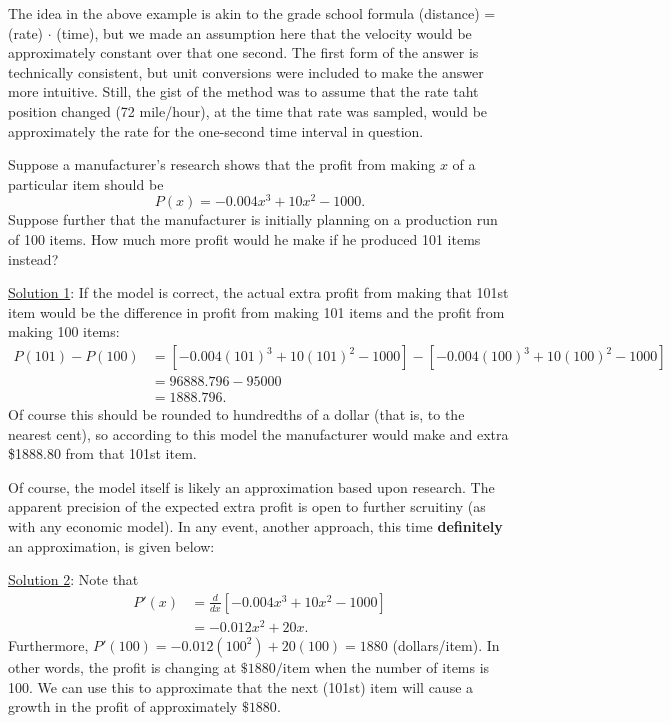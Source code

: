\label{VelocityAndLinearApproximationsI}
\eex
The idea in the above example
is  akin to the grade school formula (distance) = (rate) $\cdot$ (time),
but we made an assumption here that the velocity would be
approximately constant over that one second.  The first form 
of the answer is technically consistent, but unit conversions
were  included to make the answer more intuitive.
Still, the gist of the method was to assume
that the rate taht position changed (72 mile/hour), at the time
that rate was sampled, would be approximately the rate for the
one-second time interval in question.

\bex Suppose a manufacturer's research shows that the profit
from making $x$ of a particular item should be
$$P(x)=-0.004x^3+10x^2-1000.$$
Suppose further that the manufacturer is initially planning on a 
production run of 100 items.  How much more profit would he make if 
he produced 101 items instead?

\underline{Solution 1}: If the model is correct,
the actual extra profit from making
that 101st item would be the difference in profit from 
making 101 items and the profit from making 100 items:
\begin{align*}
P(101)-P(100)&=\left[-0.004(101)^3+10(101)^2-1000\right]
               -\left[-0.004(100)^3+10(100)^2-1000\right]\\
             &=96888.796-95000\\
             &=1888.796.\end{align*}
Of course this should be rounded to hundredths of a dollar
(that is, to the nearest cent),  so according to this
model the manufacturer would make and extra \$1888.80
from that 101st item.

Of course, the model itself is likely an approximation based upon
research.  The apparent precision of the expected extra profit
is open to further scruitiny (as with any economic model).  
In any event, another approach,
this time {\bf definitely} an approximation, is given below:

\underline{Solution 2}: Note that
\begin{align*}
P'(x)&=\frac{d}{dx}\left[-0.004x^3+10x^2-1000\right]\\
             &=-0.012x^2+20x.\end{align*}
Furthermore, $P'(100)=-0.012(100^2)+20(100)=1880$
(dollars/item).  In other words, the profit is changing at 
$\$1880/\text{item}$ when the number of items is 100.
We can use this to approximate that the next (101st)
item will cause a growth in the profit of approximately
$\$1880$.
\eex

